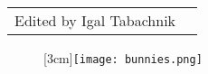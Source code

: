 \documentclass[
  spinewidth=1.375in
]{bookcover}
\begin{document}
\begin{bookcover}
{{\begin{tabular}[h]{p{3.6cm} p{10cm}}
\begin{minipage}[b]{8.5cm}
      \break
      Edited by Igal Tabachnik
      \end{minipage}
    \end{tabular}
    }
    \begin{figure}[H]
      \centering
      \raisebox{-1cm}[3cm]{\texttt{[image: bunnies.png]}}
    \end{figure}
    
  }
  
\end{bookcover}
\end{document}
